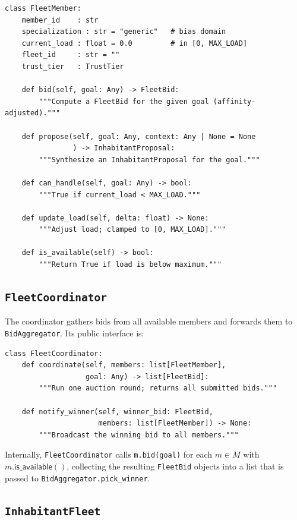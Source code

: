 \documentclass[11pt]{article}
\providecommand{\Members}{M}                        %
\providecommand{\FleetPY}{\texttt{InhabitantFleet}}
\providecommand{\CoordPY}{\texttt{FleetCoordinator}}
\providecommand{\MemberPY}{\texttt{FleetMember}}
\providecommand{\AggPY}{\texttt{BidAggregator}}
\providecommand{\FleetBidPY}{\texttt{FleetBid}}
\begin{document}
\begin{lstlisting}[style=jugeo-python, caption={\MemberPY{} core interface.}]
class FleetMember:
    member_id    : str
    specialization : str = "generic"   # bias domain
    current_load : float = 0.0         # in [0, MAX_LOAD]
    fleet_id     : str = ""
    trust_tier   : TrustTier

    def bid(self, goal: Any) -> FleetBid:
        """Compute a FleetBid for the given goal (affinity-adjusted)."""

    def propose(self, goal: Any, context: Any | None = None
                ) -> InhabitantProposal:
        """Synthesize an InhabitantProposal for the goal."""

    def can_handle(self, goal: Any) -> bool:
        """True if current_load < MAX_LOAD."""

    def update_load(self, delta: float) -> None:
        """Adjust load; clamped to [0, MAX_LOAD]."""

    def is_available(self) -> bool:
        """Return True if load is below maximum."""
\end{lstlisting}

\subsection{\CoordPY{}}\label{sec:coordinator}

The coordinator gathers bids from all available members and forwards
them to \AggPY{}.  Its public interface is:

\begin{lstlisting}[style=jugeo-python, caption={\CoordPY{} interface.}]
class FleetCoordinator:
    def coordinate(self, members: list[FleetMember],
                   goal: Any) -> list[FleetBid]:
        """Run one auction round; returns all submitted bids."""

    def notify_winner(self, winner_bid: FleetBid,
                      members: list[FleetMember]) -> None:
        """Broadcast the winning bid to all members."""
\end{lstlisting}

Internally, \CoordPY{} calls \texttt{m.bid(goal)} for each $m \in \Members$
with $m.\mathsf{is\_available}()$, collecting the resulting \FleetBidPY{}
objects into a list that is passed to \AggPY{}\texttt{.pick\_winner}.

\subsection{\FleetPY{}}\label{sec:inhabitant-fleet}
\end{document}
